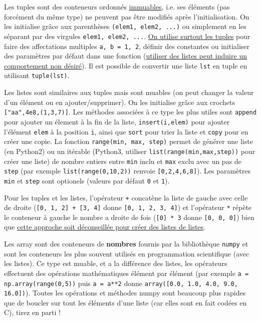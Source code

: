 \documentclass{article}
\begin{document}
Les tuples sont des conteneurs ordonnés \href{https://fr.wikipedia.org/wiki/Objet_immuable}{immuables}, i.e. ses éléments (pas forcément du même type) ne peuvent pas être modifiés après l'initialisation. On les initialise grâce aux parenthèses \texttt{(elem1, elem2, ...)} ou simplement en les séparant par des virgules \texttt{elem1, elem2, ...}. \href{http://apprendre-python.com/page-apprendre-tuples-tuple-python}{On utilise surtout les tuples} pour faire des affectations multiples \texttt{a, b = 1, 2}, définir des constantes ou initialiser des paramètres par défaut dans une fonction (\href{https://python-guide-pt-br.readthedocs.io/fr/latest/writing/gotchas.html#mutable-default-arguments}{utiliser des listes peut induire un comportement non désiré}). Il est possible de convertir une liste \texttt{lst} en tuple en utilisant \texttt{tuple(lst)}.

Les listes sont similaires aux tuples mais sont muables (on peut changer la valeur d'un élément ou en ajouter/supprimer). On les initialise grâce aux crochets \texttt{["aa",4e8,(1,3,7)]}. Les méthodes associées à ce type les plus utiles sont \texttt{append} pour ajouter un élement à la fin de la liste, \texttt{insert(i,elem)} pour ajouter l'élément \texttt{elem} à la position \texttt{i}, ainsi que \texttt{sort} pour trier la liste et \texttt{copy} pour en créer une copie. La fonction \texttt{range(min, max, step)} permet de générer une liste (en Python2) ou un itérable (Python3, utiliser \texttt{list(range(min,max,step))} pour créer une liste) de nombre entiers entre \texttt{min} inclu et \texttt{max} exclu avec un pas de \texttt{step} (par exemple \texttt{list(range(0,10,2))} renvoie \texttt{[0,2,4,6,8]}). Les paramètres \texttt{min} et \texttt{step} sont optionels (valeurs par défaut \texttt{0} et \texttt{1}).

Pour les tuples et les listes, l'opérateur \texttt{+} concatène la liste de gauche avec celle de droite (\texttt{[0, 1, 2] + [3, 4]} donne \texttt{[0, 1, 2, 3, 4]}) et l'opérateur \texttt{*} répète le conteneur à gauche le nombre a droite de fois (\texttt{[0] * 3} donne \texttt{[0, 0, 0]}) bien que \href{https://docs.python.org/fr/3.5/faq/programming.html#faq-multidimensional-list}{cette approche soit déconseillée pour créer des listes de listes}.

Les array sont des conteneurs de \textbf{nombres} fournis par la bibliothèque \texttt{numpy} et sont les conteneurs les plus souvent utilisés en programmation scientifique (avec les listes). Ce type est muable, et a la différence des listes, les opérateurs effectuent des opérations mathématiques élément par élément (par exemple \texttt{a = np.array(range(0,5))} puis \texttt{a = a**2} donne \texttt{array([0.0, 1.0, 4.0, 9.0, 16.0])}). Toutes les opérations et méthodes numpy sont beaucoup plus rapides que de boucler sur tout les éléments d'une liste (car elles sont en fait codées en C), tirez en parti !
 
\end{document}
